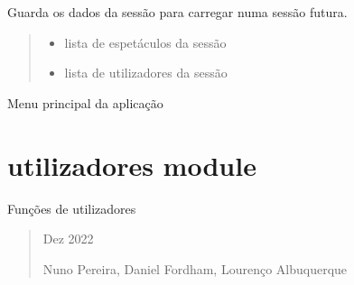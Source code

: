 \documentclass[letterpaper,10pt,portuges]{sphinxmanual}
\begin{document}

\begin{fulllineitems}
\label{\detokenize{main:main.guardar_dados}}
\pysigstartsignatures
{}
\pysigstopsignatures
\sphinxAtStartPar
Guarda os dados da sessão para carregar numa sessão futura.
\begin{quote}\begin{description}
\begin{itemize}
\item {} 
\sphinxAtStartPar
{} \textendash{} lista de espetáculos da sessão

\item {} 
\sphinxAtStartPar
{} \textendash{} lista de utilizadores da sessão

\end{itemize}

\end{description}\end{quote}

\end{fulllineitems}


\begin{fulllineitems}
\label{\detokenize{main:main.menu}}
\pysigstartsignatures
{}
\pysigstopsignatures
\sphinxAtStartPar
Menu principal da aplicação

\end{fulllineitems}


\sphinxstepscope


\section{utilizadores module}
\label{\detokenize{utilizadores:module-utilizadores}}\label{\detokenize{utilizadores:utilizadores-module}}\label{\detokenize{utilizadores::doc}}
\sphinxAtStartPar
Funções de utilizadores
\begin{quote}\begin{description}
 Dez 2022


\sphinxAtStartPar
Nuno Pereira, Daniel Fordham, Lourenço Albuquerque

\end{description}\end{quote}
\end{document}
